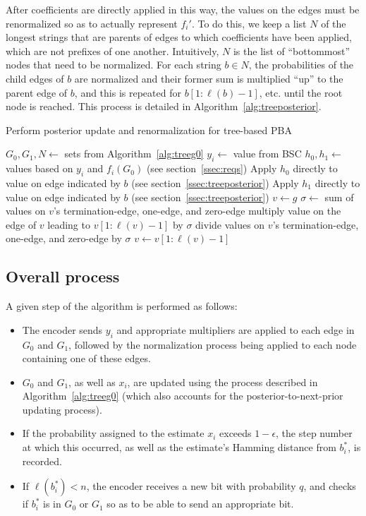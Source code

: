 \documentclass{IEEEtran}
\begin{document}
After coefficients are
directly applied in this way, the values on the edges must be renormalized
so as to actually represent $f_i'$. To do this, we
keep a list $N$ of the longest strings that are parents of edges to which
coefficients have been applied, which are not prefixes of one another.
Intuitively, $N$ is the list of ``bottommost'' nodes that need to be normalized.
For each string $b \in N$, the probabilities of the child edges of $b$
are normalized and their former sum is multiplied ``up'' to the parent edge
of $b$, and this is repeated for $b[1:\ell(b)-1]$, etc. until the root node
is reached.
This process is detailed in Algorithm~\ref{alg:treeposterior}.
\begin{algorithm}
\caption{Perform posterior update and renormalization for tree-based
	PBA}
\label{alg:treeposterior}
\begin{algorithmic}
	\STATE $G_0,G_1,N \gets$ sets from Algorithm~\ref{alg:treeg0} 
	\STATE $y_i \gets$ value from BSC
	\STATE $h_0,h_1 \gets$ values based on $y_i$ and $f_i(G_0)$
		(see section~\ref{ssec:reqs})
	\STATE Apply $h_0$ directly to value on
	edge indicated
	by $b$ (see section~\ref{ssec:treeposterior})
	\ENDFOR 
	\STATE Apply $h_1$ directly to value on
	edge indicated
	by $b$ (see section~\ref{ssec:treeposterior})
	\ENDFOR
		\STATE $v \gets g$
		\STATE $\sigma \gets$ sum of values
		on $v$'s termination-edge, one-edge,
		and zero-edge
		\STATE multiply value on the edge
		of $v$ leading to $v[1:\ell(v)-1]$
		by $\sigma$
		\STATE divide values on $v$'s
		termination-edge, one-edge, and
		zero-edge by $\sigma$
		\STATE $v \gets v[1:\ell(v)-1]$
		\ENDWHILE
	\ENDFOR
\end{algorithmic}
\end{algorithm}
\subsection{Overall process}
A given step of the algorithm is performed as follows:
\begin{itemize}
	\item The encoder sends $y_i$ and appropriate multipliers are
		applied to each edge in $G_0$ and $G_1$,
		followed by the normalization
		process being applied to each node containing one
		of these edges.
	\item $G_0$ and $G_1$, as well as $x_i$, are updated using the
		process described in Algorithm~\ref{alg:treeg0}
		(which also accounts for the
		posterior-to-next-prior updating process).
	\item If the probability assigned to the estimate $x_i$ exceeds
		$1-\epsilon$,
		the step number at which this occurred, as well as the
		estimate's Hamming distance from $b_i^*$, is recorded.
	\item If $\ell(b_i^*) < n$,
		the encoder receives a new bit with probability $q$, and
		checks if $b_i^*$ is in $G_0$ or $G_1$ so as to be
		able to send an appropriate bit.
\end{itemize}
\end{document}

